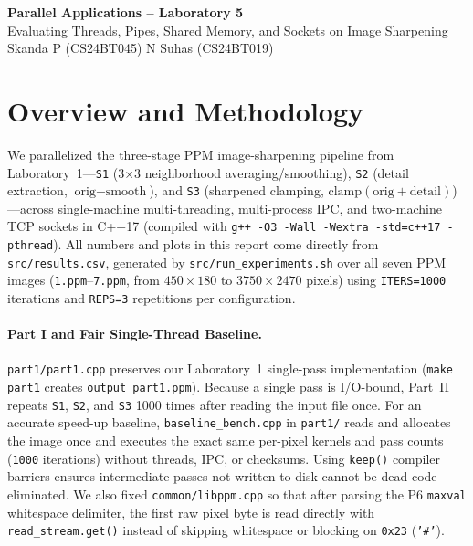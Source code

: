 \documentclass[10pt,a4paper]{article}
\begin{document}
\begin{center}
    {\LARGE \textbf{Parallel Applications -- Laboratory 5}}\\[4pt]
    {\large Evaluating Threads, Pipes, Shared Memory, and Sockets on Image Sharpening}\\[8pt]
    {\normalsize Skanda P (CS24BT045) \qquad N Suhas (CS24BT019)}
\end{center}
\vspace{4pt}

\section{Overview and Methodology}

We parallelized the three-stage PPM image-sharpening pipeline from Laboratory~1---\texttt{S1} (3$\times$3 neighborhood averaging/smoothing), \texttt{S2} (detail extraction, $\text{orig} - \text{smooth}$), and \texttt{S3} (sharpened clamping, $\text{clamp}(\text{orig} + \text{detail})$)---across single-machine multi-threading, multi-process IPC, and two-machine TCP sockets in C++17 (compiled with \texttt{g++ -O3 -Wall -Wextra -std=c++17 -pthread}). All numbers and plots in this report come directly from \texttt{src/results.csv}, generated by \texttt{src/run\_experiments.sh} over all seven PPM images (\texttt{1.ppm}--\texttt{7.ppm}, from $450\times 180$ to $3750\times 2470$ pixels) using \texttt{ITERS=1000} iterations and \texttt{REPS=3} repetitions per configuration.

\paragraph{Part I and Fair Single-Thread Baseline.}
\texttt{part1/part1.cpp} preserves our Laboratory~1 single-pass implementation (\texttt{make part1} creates \texttt{output\_part1.ppm}). Because a single pass is I/O-bound, Part~II repeats \texttt{S1}, \texttt{S2}, and \texttt{S3} 1000 times after reading the input file once. For an accurate speed-up baseline, \texttt{baseline\_bench.cpp} in \texttt{part1/} reads and allocates the image once and executes the exact same per-pixel kernels and pass counts (\texttt{1000} iterations) without threads, IPC, or checksums. Using \texttt{keep()} compiler barriers ensures intermediate passes not written to disk cannot be dead-code eliminated. We also fixed \texttt{common/libppm.cpp} so that after parsing the P6 \texttt{maxval} whitespace delimiter, the first raw pixel byte is read directly with \texttt{read\_stream.get()} instead of skipping whitespace or blocking on \texttt{0x23} (\texttt{'\#'}).
\end{document}
